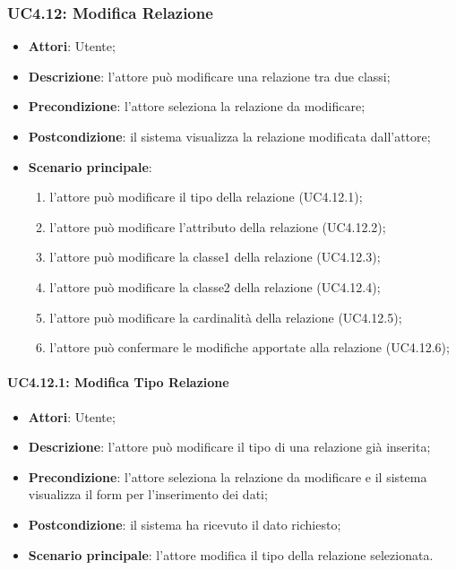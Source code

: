 \begin{itemize}
\begin{itemize}
\begin{itemize}
\begin{itemize}
\subsubsection{UC4.12: Modifica Relazione}
\label{UC4.12}
\begin{itemize}
	\item \textbf{Attori}: Utente;
	\item \textbf{Descrizione}: l'attore può modificare una relazione tra due classi;
	\item \textbf{Precondizione}: l'attore seleziona la relazione da modificare;
	\item \textbf{Postcondizione}: il sistema visualizza la relazione modificata dall'attore;
	\item \textbf{Scenario principale}:
	\begin{enumerate}
		\item l'attore può modificare il tipo della relazione (UC4.12.1);
		\item l'attore può modificare l'attributo della relazione (UC4.12.2);
		\item l'attore può modificare la classe1 della relazione (UC4.12.3);
		\item l'attore può modificare la classe2 della relazione (UC4.12.4);
		\item l'attore può modificare la cardinalità della relazione (UC4.12.5);
		\item l'attore può confermare le modifiche apportate alla relazione (UC4.12.6);
	\end{enumerate}
\end{itemize}

\paragraph{UC4.12.1: Modifica Tipo Relazione}
\label{UC4.12.1}
\begin{itemize}
	\item \textbf{Attori}: Utente;
	\item \textbf{Descrizione}: l'attore può modificare il tipo di una relazione già inserita;
	\item \textbf{Precondizione}: l'attore seleziona la relazione da modificare e il sistema visualizza il form per l'inserimento dei dati;
	\item \textbf{Postcondizione}: il sistema ha ricevuto il dato richiesto;
	\item \textbf{Scenario principale}: l'attore modifica il tipo della relazione selezionata.
\end{itemize}


\end{itemize}
\end{itemize}
\end{itemize}
\end{itemize}
